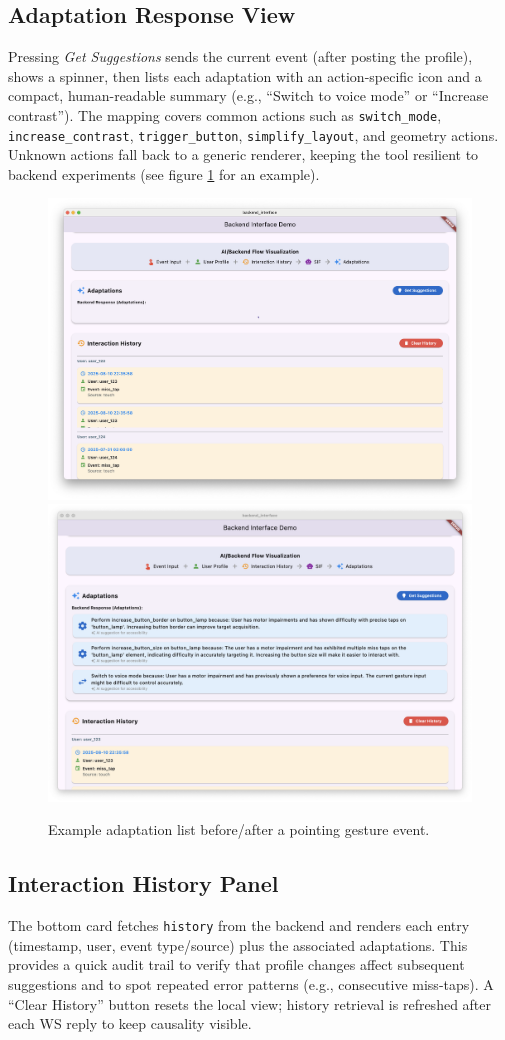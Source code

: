 \documentclass[openany]{book}
\begin{document}
\subsection{Adaptation Response View}
Pressing \emph{Get Suggestions} sends the current event (after posting the profile), shows a spinner, then lists each adaptation with an action-specific icon and a compact, human-readable summary (e.g., “Switch to voice mode” or “Increase contrast”). The mapping covers common actions such as \texttt{switch\_mode}, \texttt{increase\_contrast}, \texttt{trigger\_button}, \texttt{simplify\_layout}, and geometry actions. Unknown actions fall back to a generic renderer, keeping the tool resilient to backend experiments (see figure \ref{fig:backend-inject-adapt} for an example). 

\begin{figure}[h]
\centering
\includegraphics[width=.5\linewidth]{images/fig_backend_inject_adapt_before.png}\hfill
\includegraphics[width=.5\linewidth]{images/fig_backend_inject_adapt_after.png}
\caption{Example adaptation list before/after a pointing gesture event.}
\label{fig:backend-inject-adapt}
\end{figure}

\subsection{Interaction History Panel}
The bottom card fetches \texttt{history} from the backend and renders each entry (timestamp, user, event type/source) plus the associated adaptations. This provides a quick audit trail to verify that profile changes affect subsequent suggestions and to spot repeated error patterns (e.g., consecutive miss-taps). A “Clear History” button resets the local view; history retrieval is refreshed after each WS reply to keep causality visible.
\end{document}
